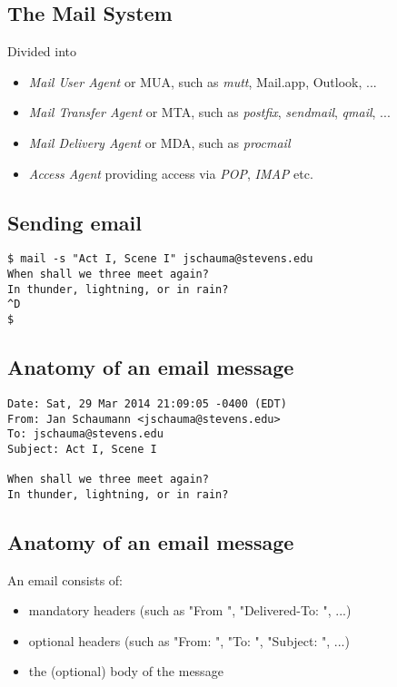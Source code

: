 \documentclass[xga]{xdvislides}
\begin{document}
\subsection{The Mail System}
Divided into
\begin{itemize}
	\item {\em Mail User Agent} or MUA, such as {\em mutt}, Mail.app, Outlook, ...
	\item {\em Mail Transfer Agent} or MTA, such as {\em postfix},
{\em sendmail}, {\em qmail}, ...
	\item {\em Mail Delivery Agent} or MDA, such as {\em procmail}
	\item {\em Access Agent} providing access via {\em POP}, {\em IMAP} etc.
\end{itemize}


\subsection{Sending email}
\begin{verbatim}
$ mail -s "Act I, Scene I" jschauma@stevens.edu
When shall we three meet again?
In thunder, lightning, or in rain?
^D
$
\end{verbatim}

\subsection{Anatomy of an email message}
\begin{verbatim}
Date: Sat, 29 Mar 2014 21:09:05 -0400 (EDT)
From: Jan Schaumann <jschauma@stevens.edu>
To: jschauma@stevens.edu
Subject: Act I, Scene I

When shall we three meet again?
In thunder, lightning, or in rain?

\end{verbatim}

\subsection{Anatomy of an email message}
An email consists of:
\begin{itemize}
	\item mandatory headers (such as "From ", "Delivered-To: ", ...)
	\item optional headers (such as "From: ", "To: ", "Subject: ", ...)
	\item the (optional) body of the message
\end{itemize}
\end{document}
